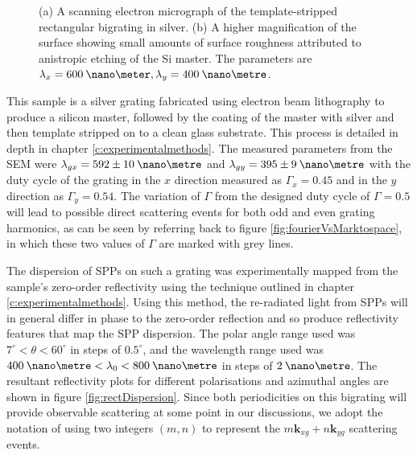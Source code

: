 \begin{figure}
\begin{center}
\end{center}
\caption[Scanning electron micrographs of the template-stripped rectangular bigrating in silver.]{(a) A scanning electron micrograph of the template-stripped rectangular bigrating in silver. (b) A higher magnification of the surface showing small amounts of surface roughness attributed to anistropic etching of the Si master. The parameters are $\lambda_x=600\:\nano\meter, \lambda_y=400\:\nano\metre$.\label{fig:rectgratingSEM}}
\end{figure}

This sample is a silver grating fabricated using electron beam lithography to produce a silicon master, followed by the coating of the master with silver and then template stripped on to a clean glass substrate. This process is detailed in depth in chapter \ref{c:experimentalmethods}. The measured parameters from the SEM were $\lambda_{gx}=592 \pm 10 \:\nano\metre$ and $\lambda_{gy}=395 \pm 9\:\nano\metre$ with the duty cycle of the grating in the $x$ direction measured as $\Gamma_x=0.45$ and in the $y$ direction as $\Gamma_y=0.54$. The variation of $\Gamma$ from the designed duty cycle of $\Gamma=0.5$ will lead to possible direct scattering events for both odd and even grating harmonics, as can be seen by referring back to figure \ref{fig:fourierVsMarktospace}, in which these two values of $\Gamma$ are marked with grey lines.

The dispersion of SPPs on such a grating was experimentally mapped from the sample's zero-order reflectivity using the technique outlined in chapter \ref{c:experimentalmethods}. Using this method, the re-radiated light from SPPs will in general differ in phase to the zero-order reflection and so produce reflectivity features that map the SPP dispersion. The polar angle range used was $7^\circ<\theta<60^\circ$ in steps of $0.5^\circ$, and the wavelength range used was $400\:\nano\metre<\lambda_0<800\:\nano\metre$ in steps of $2\:\nano\metre$. The resultant reflectivity plots for different polarisations and azimuthal angles are shown in figure \ref{fig:rectDispersion}. Since both periodicities on this bigrating will provide observable scattering at some point in our discussions, we adopt the notation of  using two integers $(m,n)$ to represent the $m\mathbf{k}_{xg}+n\mathbf{k}_{yg}$ scattering events. 

